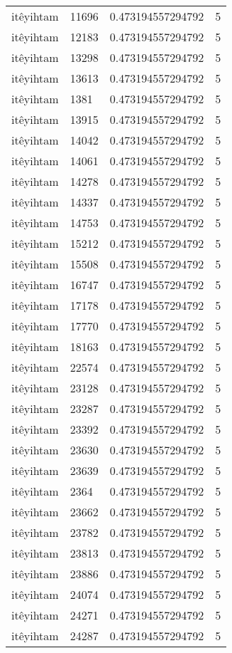 \begin{longtable}{llll}
itêyihtam & 11696 & 0.473194557294792 & 5 \\
itêyihtam & 12183 & 0.473194557294792 & 5 \\
itêyihtam & 13298 & 0.473194557294792 & 5 \\
itêyihtam & 13613 & 0.473194557294792 & 5 \\
itêyihtam & 1381 & 0.473194557294792 & 5 \\
itêyihtam & 13915 & 0.473194557294792 & 5 \\
itêyihtam & 14042 & 0.473194557294792 & 5 \\
itêyihtam & 14061 & 0.473194557294792 & 5 \\
itêyihtam & 14278 & 0.473194557294792 & 5 \\
itêyihtam & 14337 & 0.473194557294792 & 5 \\
itêyihtam & 14753 & 0.473194557294792 & 5 \\
itêyihtam & 15212 & 0.473194557294792 & 5 \\
itêyihtam & 15508 & 0.473194557294792 & 5 \\
itêyihtam & 16747 & 0.473194557294792 & 5 \\
itêyihtam & 17178 & 0.473194557294792 & 5 \\
itêyihtam & 17770 & 0.473194557294792 & 5 \\
itêyihtam & 18163 & 0.473194557294792 & 5 \\
itêyihtam & 22574 & 0.473194557294792 & 5 \\
itêyihtam & 23128 & 0.473194557294792 & 5 \\
itêyihtam & 23287 & 0.473194557294792 & 5 \\
itêyihtam & 23392 & 0.473194557294792 & 5 \\
itêyihtam & 23630 & 0.473194557294792 & 5 \\
itêyihtam & 23639 & 0.473194557294792 & 5 \\
itêyihtam & 2364 & 0.473194557294792 & 5 \\
itêyihtam & 23662 & 0.473194557294792 & 5 \\
itêyihtam & 23782 & 0.473194557294792 & 5 \\
itêyihtam & 23813 & 0.473194557294792 & 5 \\
itêyihtam & 23886 & 0.473194557294792 & 5 \\
itêyihtam & 24074 & 0.473194557294792 & 5 \\
itêyihtam & 24271 & 0.473194557294792 & 5 \\
itêyihtam & 24287 & 0.473194557294792 & 5 \\

\end{longtable}
